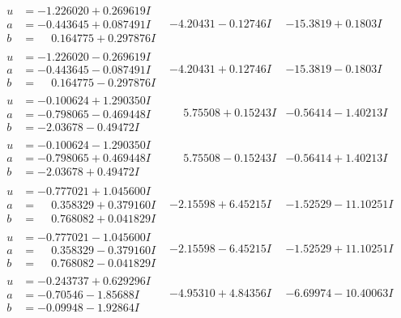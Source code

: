 \documentclass[1p]{elsarticle_modified}
\theoremstyle{definition}
\begin{document}
$$\begin{array}{c|c|c}
\begin{aligned}
u &= -1.226020 + 0.269619 I \\
a &= -0.443645 + 0.087491 I \\
b &= \phantom{-}0.164775 + 0.297876 I\end{aligned}
 & -4.20431 - 0.12746 I & -15.3819 + 0.1803 I \\ \hline\begin{aligned}
u &= -1.226020 - 0.269619 I \\
a &= -0.443645 - 0.087491 I \\
b &= \phantom{-}0.164775 - 0.297876 I\end{aligned}
 & -4.20431 + 0.12746 I & -15.3819 - 0.1803 I \\ \hline\begin{aligned}
u &= -0.100624 + 1.290350 I \\
a &= -0.798065 - 0.469448 I \\
b &= -2.03678 - 0.49472 I\end{aligned}
 & \phantom{-}5.75508 + 0.15243 I & -0.56414 - 1.40213 I \\ \hline\begin{aligned}
u &= -0.100624 - 1.290350 I \\
a &= -0.798065 + 0.469448 I \\
b &= -2.03678 + 0.49472 I\end{aligned}
 & \phantom{-}5.75508 - 0.15243 I & -0.56414 + 1.40213 I \\ \hline\begin{aligned}
u &= -0.777021 + 1.045600 I \\
a &= \phantom{-}0.358329 + 0.379160 I \\
b &= \phantom{-}0.768082 + 0.041829 I\end{aligned}
 & -2.15598 + 6.45215 I & -1.52529 - 11.10251 I \\ \hline\begin{aligned}
u &= -0.777021 - 1.045600 I \\
a &= \phantom{-}0.358329 - 0.379160 I \\
b &= \phantom{-}0.768082 - 0.041829 I\end{aligned}
 & -2.15598 - 6.45215 I & -1.52529 + 11.10251 I \\ \hline\begin{aligned}
u &= -0.243737 + 0.629296 I \\
a &= -0.70546 - 1.85688 I \\
b &= -0.09948 - 1.92864 I\end{aligned}
 & -4.95310 + 4.84356 I & -6.69974 - 10.40063 I \\ \hline\begin{aligned}

\end{aligned}
\end{array}$$
\end{document}
